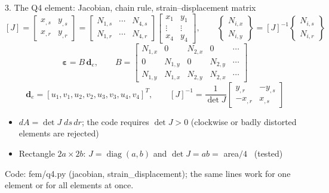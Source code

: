 \documentclass[aspectratio=169,10pt]{beamer}
\newcommand{\vd}{\mathbf d}
\newcommand{\src}[1]{{\color{muted}\scriptsize #1}}
\begin{document}
\begin{frame}{3. The Q4 element: Jacobian, chain rule, strain--displacement matrix}
  \[
    [J]=\begin{bmatrix}x_{,s}&y_{,s}\\ x_{,r}&y_{,r}\end{bmatrix}
       =\begin{bmatrix}N_{1,s}&\cdots&N_{4,s}\\ N_{1,r}&\cdots&N_{4,r}\end{bmatrix}
        \begin{bmatrix}x_1&y_1\\ \vdots&\vdots\\ x_4&y_4\end{bmatrix},
    \qquad
    \begin{Bmatrix}N_{i,x}\\ N_{i,y}\end{Bmatrix}=[J]^{-1}\begin{Bmatrix}N_{i,s}\\ N_{i,r}\end{Bmatrix}
  \]
  \[
    \bm\varepsilon=B\,\vd_e,\qquad
    B=\begin{bmatrix}N_{1,x}&0&N_{2,x}&0&\cdots\\ 0&N_{1,y}&0&N_{2,y}&\cdots\\ N_{1,y}&N_{1,x}&N_{2,y}&N_{2,x}&\cdots\end{bmatrix}
  \]
  \[
    \vd_e=[u_1,v_1,u_2,v_2,u_3,v_3,u_4,v_4]^T,\qquad
    [J]^{-1}=\frac{1}{\det J}\begin{bmatrix}y_{,r}&-y_{,s}\\ -x_{,r}&x_{,s}\end{bmatrix}
  \]
  \begin{itemize}
    \item $dA=\det J\;ds\,dr$; the code requires $\det J>0$ (clockwise or badly distorted elements are rejected)
    \item Rectangle $2a\times2b$: $J=\operatorname{diag}(a,b)$ and $\det J=ab=$ area$/4$ \ (tested)
  \end{itemize}
  \vfill
  \src{Code: fem/q4.py (jacobian, strain\_displacement); the same lines work for one element or for all elements at once.}
\end{frame}
\end{document}
